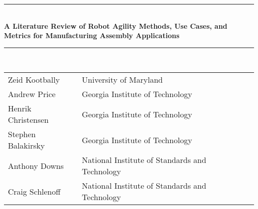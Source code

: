 \begin{titlepage}
\begin{center}


\vspace{1.5cm} %
\rule[1ex]{1\textwidth}{0.3mm} \\%
\huge{\textbf{A Literature Review of Robot Agility Methods, Use Cases, and Metrics for Manufacturing Assembly Applications}}\\
\rule[1ex]{1\textwidth}{0.3mm} \\%

\vspace{1.5cm} %

\vspace{1.5cm} %
\begin{small}
\begin{tabular}{p{3.8cm}p{7.5cm}l}
Zeid Kootbally & University of Maryland  &  \\
Andrew Price & Georgia Institute of Technology  &  \\
Henrik Christensen & Georgia Institute of Technology  &  \\
Stephen Balakirsky & Georgia Institute of Technology  & \\
Anthony Downs & National Institute of Standards and Technology  &  \\
Craig Schlenoff & National Institute of Standards and Technology  & \\
\end{tabular}
\end{small}
\end{center}
\end{titlepage}
\cleardoublepage
